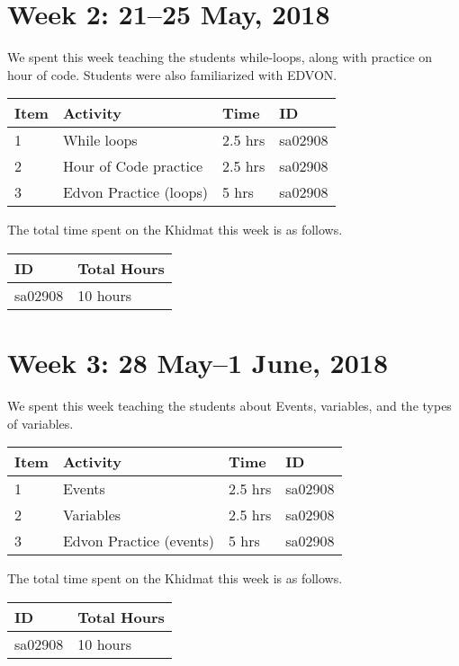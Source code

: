 \documentclass{article}
\begin{document}

\newpage 
\section*{Week 2: 21--25 May, 2018}

We spent this week teaching the students while-loops, along with practice on hour of code. Students were also familiarized with EDVON.

\begin{tabular}{|l|l|l|l|}
  \hline
  Item  & Activity & Time & ID \\\hline\hline
  1 & While loops & 2.5 hrs & sa02908 \\\hline
  2 & Hour of Code practice & 2.5 hrs & sa02908 \\\hline
  3 & Edvon Practice (loops) & 5 hrs & sa02908 \\\hline
\end{tabular}

The total time spent on the Khidmat this week is as follows.

\begin{tabular}{|l|l|}
  \hline
  ID & Total Hours\\\hline\hline
  sa02908 & 10 hours\\\hline
\end{tabular}


\newpage 
\section*{Week 3: 28 May--1 June, 2018}

We spent this week teaching the students about Events, variables, and the types of variables.

\begin{tabular}{|l|l|l|l|}
  \hline
  Item  & Activity & Time & ID \\\hline\hline
  1 & Events & 2.5 hrs & sa02908 \\\hline
  2 & Variables & 2.5 hrs & sa02908 \\\hline
  3 & Edvon Practice (events) & 5 hrs & sa02908 \\\hline
\end{tabular}

The total time spent on the Khidmat this week is as follows.

\begin{tabular}{|l|l|}
  \hline
  ID & Total Hours\\\hline\hline
  sa02908 & 10 hours\\\hline
\end{tabular}
\end{document}
